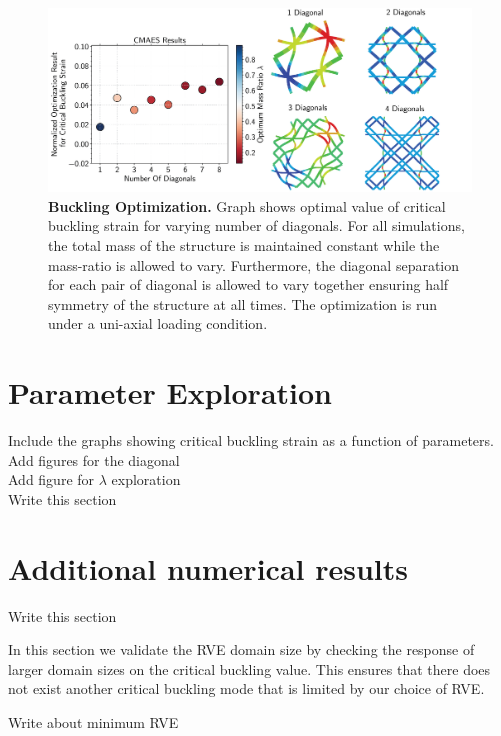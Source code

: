 \documentclass[10pt,twoside]{fernandes_supp}
\newcommand{\mf}[1]{\colorbox{blue!10}{\color{color3}#1}}
\begin{document}
\begin{figure}[H]
    \centering
    \includegraphics[width=0.9\linewidth]{SFig6.png}
    \caption{{\bf Buckling Optimization.} Graph shows optimal value of critical buckling strain for varying number of diagonals. For all simulations, the total mass of the structure is maintained constant while the mass-ratio is allowed to vary. Furthermore, the diagonal separation for each pair of diagonal is allowed to vary together ensuring half symmetry of the structure at all times. The optimization is run under a uni-axial loading condition.}
    \label{BucklingOptimization}
\end{figure}

\section{Parameter Exploration}
Include the graphs showing critical buckling strain as a function of parameters.\\
\mf{Add figures for the diagonal}\\
\mf{Add figure for $\lambda$ exploration}\\
\mf{Write this section}


\section{Additional numerical results}
\mf{Write this section}

 In this section we validate the RVE domain size by checking the response of larger domain sizes on the critical buckling value. This ensures that there does not exist another critical buckling mode that is limited by our choice of RVE.

\mf{Write about minimum RVE}


\nocite{aizenberg2005}
\nocite{deshpande2001}
\nocite{miserez2008}
\nocite{weaver2010}



% 
\end{document}
